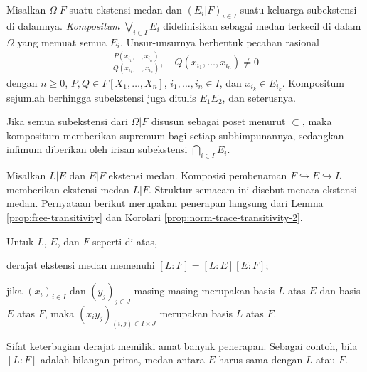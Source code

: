 \begin{definition}
	Misalkan $\Omega|F$ suatu ekstensi medan dan $(E_i|F)_{i \in I}$ suatu keluarga subekstensi di dalamnya. \emph{Kompositum} $\bigvee_{i \in I} E_i$ didefinisikan sebagai medan terkecil di dalam $\Omega$ yang memuat semua $E_i$. Unsur-unsurnya berbentuk pecahan rasional
	\begin{gather}\label{eqn:fields-compositum}
		\frac{P(x_{i_1}, \ldots, x_{i_n})}{Q(x_{i_1}, \ldots, x_{i_n})}, \quad Q(x_{i_1}, \ldots, x_{i_n}) \neq 0
	\end{gather}
	dengan $n \geq 0$, $P, Q \in F[X_1, \ldots, X_n]$, $i_1, \ldots, i_n \in I$, dan $x_{i_k} \in E_{i_k}$. Kompositum sejumlah berhingga subekstensi juga ditulis $E_1 E_2$, dan seterusnya.
\end{definition}
Jika semua subekstensi dari $\Omega|F$ disusun sebagai poset menurut $\subset$, maka kompositum memberikan supremum bagi setiap subhimpunannya, sedangkan infimum diberikan oleh irisan subekstensi $\bigcap_{i \in I} E_i$.

Misalkan $L|E$ dan $E|F$ ekstensi medan. Komposisi pembenaman $F \hookrightarrow E \hookrightarrow L$ memberikan ekstensi medan $L|F$. Struktur semacam ini disebut menara ekstensi medan. Pernyataan berikut merupakan penerapan langsung dari Lemma \ref{prop:free-transitivity} dan Korolari \ref{prop:norm-trace-transitivity-2}. 
\begin{proposition}\label{prop:field-tower-degree}
	Untuk $L$, $E$, dan $F$ seperti di atas,
	\begin{compactitem}
		\item derajat ekstensi medan memenuhi $[L:F]=[L:E][E:F]$;
		\item jika $(x_i)_{i \in I}$ dan $(y_j)_{j \in J}$ masing-masing merupakan basis $L$ atas $E$ dan basis $E$ atas $F$, maka $(x_i y_j)_{(i,j) \in I \times J}$ merupakan basis $L$ atas $F$.
	\end{compactitem}
\end{proposition}
Sifat keterbagian derajat memiliki amat banyak penerapan. Sebagai contoh, bila $[L:F]$ adalah bilangan prima, medan antara $E$ harus sama dengan $L$ atau $F$.

